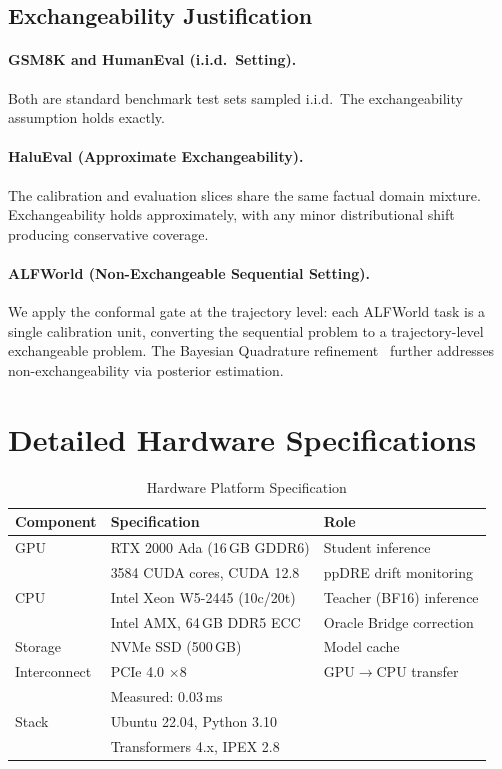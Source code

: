\documentclass{uai2026}  %
\begin{document}
\subsection{Exchangeability Justification}

\paragraph{GSM8K and HumanEval (i.i.d.\ Setting).}
Both are standard benchmark test sets sampled i.i.d.\
The exchangeability assumption holds exactly.

\paragraph{HaluEval (Approximate Exchangeability).}
The calibration and evaluation slices share the same factual domain
mixture. Exchangeability holds approximately, with any minor
distributional shift producing conservative coverage.

\paragraph{ALFWorld (Non-Exchangeable Sequential Setting).}
We apply the conformal gate at the trajectory level: each ALFWorld
task is a single calibration unit, converting the sequential problem
to a trajectory-level exchangeable problem.
The Bayesian Quadrature refinement~\cite{snell2025conformal}
further addresses non-exchangeability via posterior estimation.

\section{Detailed Hardware Specifications}
\label{app:hardware}

\begin{table}[H]
\centering
\caption{Hardware Platform Specification}
\label{tab:hardware_spec}
\begin{tabular}{@{}lll@{}}
\toprule
\textbf{Component} & \textbf{Specification} & \textbf{Role} \\
\midrule
GPU & RTX 2000 Ada (16\,GB GDDR6) & Student inference \\
    & 3584 CUDA cores, CUDA 12.8 & ppDRE drift monitoring \\
\midrule
CPU & Intel Xeon W5-2445 (10c/20t) & Teacher (BF16) inference \\
    & Intel AMX, 64\,GB DDR5 ECC & Oracle Bridge correction \\
\midrule
Storage & NVMe SSD (500\,GB) & Model cache \\
\midrule
Interconnect & PCIe 4.0 $\times$8 & GPU$\to$CPU transfer \\
             & Measured: 0.03\,ms & \\
\midrule
Stack & Ubuntu 22.04, Python 3.10 & \\
      & Transformers 4.x, IPEX 2.8 & \\
\bottomrule
\end{tabular}
\end{table}
\end{document}
